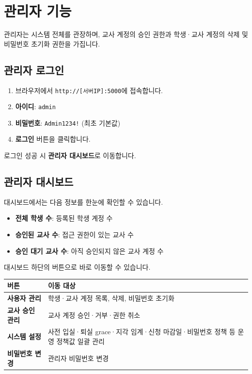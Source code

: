 \documentclass[a4paper,12pt]{article}
\newcommand{\menu}[1]{\textcolor{primary}{\textbf{#1}}}
\begin{document}
\section{관리자 기능}

관리자는 시스템 전체를 관장하며, 교사 계정의 승인 권한과
학생·교사 계정의 삭제 및 비밀번호 초기화 권한을 가집니다.

\subsection{관리자 로그인}

\begin{enumerate}[leftmargin=1.5em]
    \item 브라우저에서 \texttt{http://[서버IP]:5000}에 접속합니다.
    \item \textbf{아이디}: \texttt{admin}
    \item \textbf{비밀번호}: \texttt{Admin1234!} (최초 기본값)
    \item \menu{로그인} 버튼을 클릭합니다.
\end{enumerate}

로그인 성공 시 \textbf{관리자 대시보드}로 이동합니다.

\subsection{관리자 대시보드}

대시보드에서는 다음 정보를 한눈에 확인할 수 있습니다.

\begin{itemize}[leftmargin=1.5em]
    \item \textbf{전체 학생 수}: 등록된 학생 계정 수
    \item \textbf{승인된 교사 수}: 접근 권한이 있는 교사 수
    \item \textbf{승인 대기 교사 수}: 아직 승인되지 않은 교사 계정 수
\end{itemize}

대시보드 하단의 버튼으로 바로 이동할 수 있습니다.

\begin{center}
\begin{tabular}{ll}
\toprule
\textbf{버튼} & \textbf{이동 대상} \\
\midrule
\menu{사용자 관리} & 학생·교사 계정 목록, 삭제, 비밀번호 초기화 \\
\menu{교사 승인 관리} & 교사 계정 승인·거부·권한 취소 \\
\menu{시스템 설정} & 사전 입실·퇴실 grace·지각 임계·신청 마감일·비밀번호 정책 등 운영 정책값 일괄 관리 \\
\menu{비밀번호 변경} & 관리자 비밀번호 변경 \\
\bottomrule
\end{tabular}
\end{center}
\end{document}
